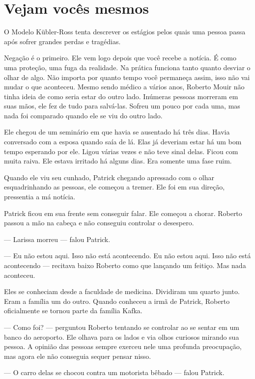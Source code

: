 \chapter{Vejam vocês mesmos}

O Modelo Kübler-Ross tenta descrever os estágios pelos quais uma pessoa passa após sofrer grandes perdas e tragédias.

Negação é o primeiro. Ele vem logo depois que você recebe a notícia. É como uma proteção, uma fuga da realidade. Na prática funciona tanto quanto desviar o olhar de algo. Não importa por quanto tempo você permaneça assim, isso não vai mudar o que aconteceu. Mesmo sendo médico a vários anos, Roberto Mouir não tinha ideia de como seria estar do outro lado. Inúmeras pessoas morreram em suas mãos, ele fez de tudo para salvá-las. Sofreu um pouco por cada uma, mas nada foi comparado quando ele se viu do outro lado.

Ele chegou de um seminário em que havia se ausentado há três dias. Havia conversado com a esposa quando saía de lá. Elas já deveriam estar há um bom tempo esperando por ele. Ligou várias vezes e não teve sinal delas. Ficou com muita raiva. Ele estava irritado há alguns dias. Era somente uma fase ruim.

Quando ele viu seu cunhado, Patrick\mudanca{,} chegando apressado com o olhar esquadrinhando as pessoas, ele começou a tremer. Ele foi em sua direção, pressentia a má notícia.

Patrick ficou em sua frente sem conseguir falar. Ele começou a chorar. Roberto passou a mão na cabeça e não conseguiu controlar o desespero.

--- Larissa morreu --- falou Patrick.

--- Eu não estou aqui. Isso não está acontecendo. Eu não estou aqui. Isso não está acontecendo --- recitava baixo Roberto como que lançando um feitiço. Mas nada aconteceu.

Eles se conheciam desde a faculdade de medicina. Dividiram um quarto junto. Eram a família um do outro. Quando conheceu a irmã de Patrick, Roberto oficialmente se tornou parte da família Kafka.

--- Como foi? --- perguntou Roberto tentando se controlar ao se sentar em um banco do aeroporto. Ele olhava para os lados e via olhos curiosos mirando sua pessoa. A opinião das pessoas sempre exerceu nele uma profunda preocupação, mas agora ele não conseguia sequer pensar nisso.

--- O carro delas se chocou contra um motorista bêbado --- falou Patrick.

